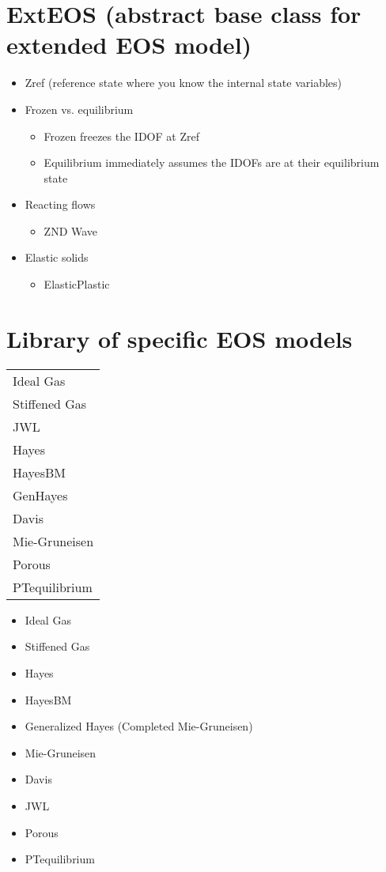 \documentclass[twocolumn,10pt]{asme2ej}
\begin{document}
\section{ExtEOS (abstract base class for extended EOS model)}

\begin{itemize}
	\item Zref (reference state where you know the internal state variables)
	\item Frozen vs. equilibrium
		\begin{itemize}
			\item Frozen freezes the IDOF at Zref
			\item Equilibrium immediately assumes the IDOFs are at their equilibrium state
		\end{itemize}
\end{itemize}

\begin{itemize}
	\item Reacting flows
		\begin{itemize}
			\item ZND Wave
		\end{itemize}
	\item Elastic solids
		\begin{itemize}	
			\item ElasticPlastic
		\end{itemize}
\end{itemize}

\section{Library of specific EOS models}

\begin{tabular}[]{| l |}
\hline
Ideal Gas\\
Stiffened Gas\\
JWL\cite{RN746}\\
Hayes\cite{RN837}\\ 
HayesBM\\
GenHayes\\
Davis\cite{RN743}\\
Mie-Gruneisen\cite{RN824}\\
Porous\cite{RN837}\\
PTequilibrium\\
\hline
\end{tabular}

\begin{itemize}
	\item Ideal Gas
	\item Stiffened Gas
	\item Hayes
	\item HayesBM
	\item Generalized Hayes (Completed Mie-Gruneisen)
	\item Mie-Gruneisen
	\item Davis
	\item JWL 
	\item Porous
	\item PTequilibrium
\end{itemize}
\end{document}
